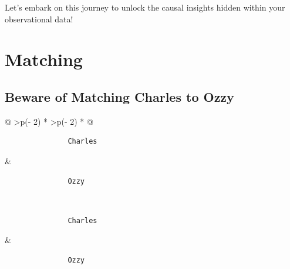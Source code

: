 \documentclass[
  letterpaper,
  DIV=11,
  numbers=noendperiod]{scrreprt}
\begin{document}
Let's embark on this journey to unlock the causal insights hidden within
your observational data!

\chapter{Matching}\label{matching}

\section{Beware of Matching Charles to
Ozzy}\label{beware-of-matching-charles-to-ozzy}

\begin{longtable}[]{@{}
  >{\centering\arraybackslash}p{(\columnwidth - 2\tabcolsep) * }
  >{\centering\arraybackslash}p{(\columnwidth - 2\tabcolsep) * }@{}}
\caption{Matching Charles to
Ozzy}\label{tbl-ozzy_and_charles}\tabularnewline
\toprule\noalign{}
\begin{minipage}[b]{\linewidth}\centering
\begin{verbatim}
               Charles
\end{verbatim}
\end{minipage} & \begin{minipage}[b]{\linewidth}\centering
\begin{verbatim}
               Ozzy
\end{verbatim}
\end{minipage} \\
\midrule\noalign{}
\endfirsthead
\toprule\noalign{}
\begin{minipage}[b]{\linewidth}\centering
\begin{verbatim}
               Charles
\end{verbatim}
\end{minipage} & \begin{minipage}[b]{\linewidth}\centering
\begin{verbatim}
               Ozzy
\end{verbatim}
\end{minipage} \\
\midrule\noalign{}
\endhead
\bottomrule\noalign{}
\endlastfoot
\begin{minipage}[t]{\linewidth}\centering

\end{minipage}
\end{longtable}
\end{document}
